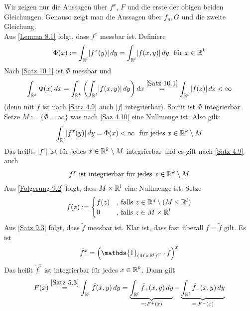 \documentclass[a4paper,twoside,DIV15,BCOR12mm,chapterprefix=true,headings=onelinechapter]{scrbook}
\begin{document}
\begin{beweis}
Wir zeigen nur die Aussagen über \(f^x\), $F$ und die erste der obigen beiden Gleichungen. Genauso zeigt man die Aussagen über \(f_n, G\) und die zweite Gleichung.\\
Aus \ref{Lemma 8.1} folgt, dass \(f^x\) messbar ist. Definiere
	\begin{align*}
	\Phi(x) := \int_{\mathbb{R}^l}\lvert f^x(y)\rvert\,dy 
	= \int_{\mathbb{R}^l}\lvert f(x,y)\rvert\,dy \ \text{ für } x\in\mathbb{R}^k 
	\end{align*}
Nach \ref{Satz 10.1} ist \(\Phi\) messbar und 
	\begin{align*}
	\int_{\mathbb{R}^k}\Phi(x)\,dx 
	= \int_{\mathbb{R}^k}\left(\int_{\mathbb{R}^l}\lvert f(x,y)\rvert\,dy\right)dx \overset{\ref{Satz 10.1}} 
	= \int_{\mathbb{R}^d}\lvert f(z)\rvert\,dz 
	< \infty
	\end{align*}
(denn mit $f$ ist nach \ref{Satz 4.9} auch \(\lvert f\rvert\) integrierbar). Somit ist \(\Phi\) integrierbar.
Setze \(M:=\{\Phi = \infty \}\) was nach \ref{Saz 4.10} eine Nullmenge ist. 
Also gilt:
	\begin{align*}
	\int_{\mathbb{R}^l}\lvert f^x(y)\rvert\,dy 
	= \Phi(x) < \infty \ \text{ für jedes } x\in\mathbb{R}^k\setminus M 
	\end{align*}
Das heißt, \(\lvert f^x\rvert\) ist für jedes \(x\in\mathbb{R}^k\setminus M\) integrierbar und es gilt nach \ref{Satz 4.9} auch
	\begin{align*}
	f^x \text{ ist integrierbar für jedes } x\in\mathbb{R}^k\setminus M
	\end{align*}
Aus \ref{Folgerung 9.2} folgt, dass \(M\times\mathbb{R}^l\) eine Nullmenge ist.
Setze
	\begin{align*}
	\tilde f(z):=
		\begin{cases}
		f(z)	&\text{, falls } z\in\mathbb{R}^d\setminus(M\times\mathbb{R}^l)\\
		0	&\text{, falls } z\in M\times\mathbb{R}^l
		\end{cases}
	\end{align*}
Aus \ref{Satz 9.3} folgt, dass \(\tilde f\) messbar ist. Klar ist, dass fast überall \(f=\tilde f\) gilt. Es ist 
\[\tilde f^x = \left(\mathds{1}_{(M\times\mdr^l)^C}\cdot f\right)^x\]
Das heißt \(\tilde f^x\) ist integrierbar für jedes \(x\in\mathbb{R}^k\). Dann gilt
	\begin{align*}
	 F(x) \overset{\ref{Satz 5.3}} 
	= \int_{\mathbb{R}^l}\tilde f(x,y)\,dy 
	= \underbrace{\int_{\mathbb{R}^l}\tilde f_+ (x,y)\,dy}_{=:F^+(x)} - \underbrace{\int_{\mathbb{R}^l}\tilde f_- (x,y)\,dy}_{=:F^-(x)} 
	\end{align*}

\end{beweis}
\end{document}
